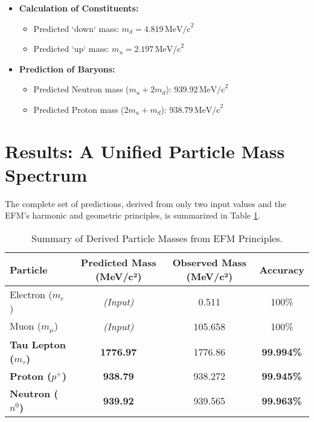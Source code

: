 \documentclass[11pt, twoside]{article}
\begin{document}
\begin{itemize}
    \item \textbf{Calculation of Constituents:}
    \begin{itemize}
        \item Predicted `down` mass: \(m_d = 4.819 \, \text{MeV/c}^2\)
        \item Predicted `up` mass: \(m_u = 2.197 \, \text{MeV/c}^2\)
    \end{itemize}
    \item \textbf{Prediction of Baryons:}
    \begin{itemize}
        \item Predicted Neutron mass (\(m_u + 2m_d\)): \(939.92 \, \text{MeV/c}^2\)
        \item Predicted Proton mass (\(2m_u + m_d\)): \(938.79 \, \text{MeV/c}^2\)
    \end{itemize}
\end{itemize}

\section{Results: A Unified Particle Mass Spectrum}
The complete set of predictions, derived from only two input values and the EFM's harmonic and geometric principles, is summarized in Table \ref{tab:results}.

\begin{table}[ht]
    \centering
    \caption{Summary of Derived Particle Masses from EFM Principles.}
    \label{tab:results}
    \begin{tabular}{@{}lccc@{}}
        \toprule
        \textbf{Particle} & \textbf{Predicted Mass (MeV/c²)} & \textbf{Observed Mass (MeV/c²)} & \textbf{Accuracy} \\
        \midrule
        Electron (\(m_e\)) & \textit{(Input)} & 0.511 & 100\% \\
        Muon (\(m_\mu\)) & \textit{(Input)} & 105.658 & 100\% \\
        \textbf{Tau Lepton (\(m_\tau\))} & \textbf{1776.97} & 1776.86 & \textbf{99.994\%} \\
        \midrule
        \textbf{Proton (\(p^+\))} & \textbf{938.79} & 938.272 & \textbf{99.945\%} \\
        \textbf{Neutron (\(n^0\))} & \textbf{939.92} & 939.565 & \textbf{99.963\%} \\
        \bottomrule
    \end{tabular}
\end{table}
\end{document}

